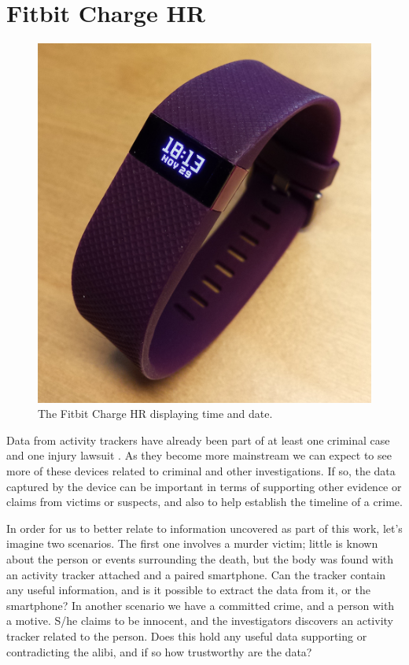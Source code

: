 \documentclass[a4paper,11pt,dvips]{article}
\begin{document}
\section{Fitbit Charge HR}
\begin{figure}
	\begin{center}
		\includegraphics[natwidth=1000bp,natheight=1019bp,width=0.8\linewidth]{fitbit_charge_hr}
	\end{center}
	\caption{The Fitbit Charge HR displaying time and date.}
	\label{fig:fitbit_charge_hr}
\end{figure}
Data from activity trackers have already been part of at least one criminal case \citep{Snyder:2015} and one injury lawsuit \citep{Olson:2014}. As they become more mainstream we can expect to see more of these devices related to criminal and other investigations. If so, the data captured by the device can be important in terms of supporting other evidence or claims from victims or suspects, and also to help establish the timeline of a crime.

In order for us to better relate to information uncovered as part of this work, let's imagine two scenarios. The first one involves a murder victim; little is known about the person or events surrounding the death, but the body was found with an activity tracker attached and a paired smartphone. Can the tracker contain any useful information, and is it possible to extract the data from it, or the smartphone? In another scenario we have a committed crime, and a person with a motive. S/he claims to be innocent, and the investigators discovers an activity tracker related to the person. Does this hold any useful data supporting or contradicting the alibi, and if so how trustworthy are the data?
\end{document}
